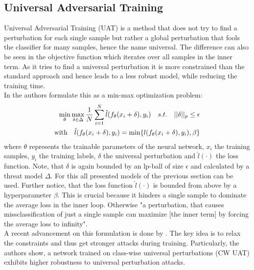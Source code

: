 \documentclass[conference]{IEEEtran}
\begin{document}
\subsection{Universal Adversarial Training}
Universal Adversarial Training (UAT) is a method that does not try to find a perturbation for each single sample but rather a global perturbation that fools the classifier for many samples, hence the name universal. The difference can also be seen in the objective function which iterates over all samples in the inner term. As it tries to find a universal perturbation it is more constrained than the standard approach and hence leads to a less robust model, while reducing the training time. \\
In \cite{b4} the authors formulate this as a min-max optimization problem:
\begin{align*}
  \min_{\theta} \max_{\delta \in \Delta} \space \frac{1}{N} \sum_{i=1}^N \space \hat{l}(f_{\theta}(x_i + \delta), y_i) \quad s.t. \quad ||\delta||_p \leq \epsilon \\
  \text{with} \quad \hat{l}(f_{\theta}(x_i + \delta), y_i) = \min \{l(f_{\theta}(x_i + \delta), y_i), \beta \} \\
\end{align*}
where $\theta$ represents the trainable parameters of the neural network, $x_i$ the training samples, $y_i$ the training labels, $\delta$ the universal perturbation and $\hat{l}(\cdot)$ the loss function. Note, that $\delta$ is again bounded by an lp-ball of size $\epsilon$ and calculated by a threat model $\Delta$. For this all presented models of the previous section can be used. Further notice, that the loss function $\hat{l}(\cdot)$ is bounded from above by a hyperparameter $\beta$. This is crucial because it hinders a single sample to dominate the average loss in the inner loop. Otherwise "a perturbation, that causes missclassification of just a single sample can maximize [the inner term] by forcing the average loss to infinity"\cite{b4}. \\
A recent advancement on this formulation is done by \cite{b11}. The key idea is to relax the constraints and thus get stronger attacks during training. Particularly, the authors show, a network trained on class-wise universal perturbations (CW UAT) exhibits higher robustness to universal perturbation attacks.

\end{document}
